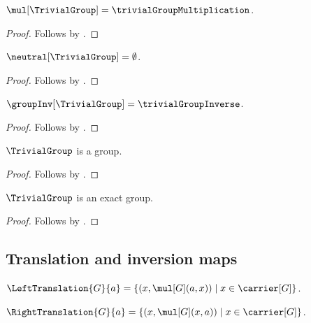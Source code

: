 \begin{proposition}\label{trivial_group_mul}
    $\mul[\TrivialGroup]=\trivialGroupMultiplication$.
\end{proposition}
\begin{proof}
    Follows by .
\end{proof}

\begin{proposition}\label{trivial_group_neutral}
    $\neutral[\TrivialGroup]=\emptyset$.
\end{proposition}
\begin{proof}
    Follows by .
\end{proof}

\begin{proposition}\label{trivial_group_inv}
    $\groupInv[\TrivialGroup]=\trivialGroupInverse$.
\end{proposition}
\begin{proof}
    Follows by .
\end{proof}

\begin{corollary}\label{trivial_group_is_group}
    $\TrivialGroup$ is a group.
\end{corollary}
\begin{proof}
    Follows by .
\end{proof}

\begin{proposition}\label{trivial_group_is_exact}
    $\TrivialGroup$ is an exact group.
\end{proposition}
\begin{proof}
    Follows by .
\end{proof}

\subsection{Translation and inversion maps}

\begin{definition}\label{left_translation}
    $\LeftTranslation{G}{a}=
        \{(x,\mul[G](a,x))\mid x\in\carrier[G]\}$.
\end{definition}

\begin{definition}\label{right_translation}
    $\RightTranslation{G}{a}=
        \{(x,\mul[G](x,a))\mid x\in\carrier[G]\}$.
\end{definition}


